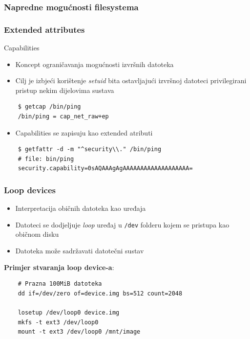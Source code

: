 \documentclass[t]{beamer}
\begin{document}
\begin{frame}[fragile]
	\frametitle{Napredne mogućnosti filesystema}
	\frametitle{Extended attributes}
	Capabilities
	\begin{itemize}
		\item Koncept ograničavanja mogućnosti izvršnih datoteka
		\item Cilj je izbjeći korištenje \textit{setuid} bita ostavljajući izvršnoj datoteci privilegirani pristup nekim dijelovima sustava
	\end{itemize}
	\vspace{1em}
	{\footnotesize \begin{verbatim}
	$ getcap /bin/ping
	/bin/ping = cap_net_raw+ep
	\end{verbatim}}
	\begin{itemize}
		\item Capabilities se zapisuju kao extended atributi
	\end{itemize}
	{\footnotesize \begin{verbatim}
	$ getfattr -d -m "^security\\." /bin/ping
	# file: bin/ping
	security.capability=0sAQAAAgAgAAAAAAAAAAAAAAAAAAA=
	\end{verbatim}}
\end{frame}

\begin{frame}[fragile]
	\frametitle{Loop devices}
	\begin{itemize}
		\item Interpretacija običnih datoteka kao uređaja
		\item Datoteci se dodjeljuje \emph{loop} uređaj u \texttt{/dev} folderu kojem se pristupa kao običnom disku
	\end{itemize}
	\begin{itemize}
		\item Datoteka može sadržavati datotečni sustav
	\end{itemize}
	\vfill
	\textbf{Primjer stvaranja loop device-a}:
	\begin{verbatim}
	# Prazna 100MiB datoteka
	dd if=/dev/zero of=device.img bs=512 count=2048
	
	losetup /dev/loop0 device.img
	mkfs -t ext3 /dev/loop0
	mount -t ext3 /dev/loop0 /mnt/image
	\end{verbatim}
\end{frame}
\end{document}
